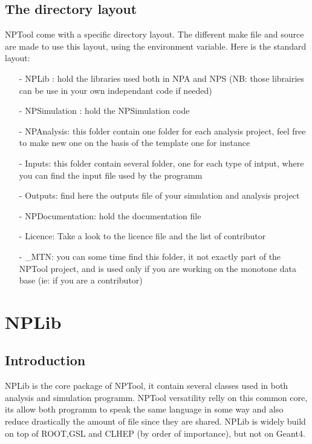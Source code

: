 \documentclass{book}
\begin{document}
				
				
\section{The directory layout}
	NPTool come with a specific directory layout. 
	The different make file and source are made to use this layout, using the environment variable. 
	Here is the standard layout:
		\begin{itemize}
			\item[-] NPLib : hold the libraries used both in NPA and NPS (NB: those librairies can be use in your own independant code if needed)
			\item[-] NPSimulation : hold the NPSimulation code
			\item[-] NPAnalysis: this folder contain one folder for each analysis project, feel free to make new one on the basis of the template one for instance
			\item[-] Inputs: this folder contain several folder, one for each type of intput, where you can find the input file used by the programm
			\item[-] Outputs: find here the outputs file of your simulation and analysis project
			\item[-] NPDocumentation: hold the documentation file
			\item[-] Licence: Take a look to the licence file and the list of contributor
			\item[-] \_MTN: you can some time find this folder, it not exactly part of the NPTool project, and is used only if you are working on the monotone data base (ie: if you are a contributor)
			\item[] 		
		\end{itemize}
\chapter[NPLib]{NPLib}
	\section{Introduction}
	
	NPLib is the core package of NPTool, it contain several classes used in both analysis and simulation programm.
	NPTool versatility relly on this common core, its allow both programm to speak the same language in some way and also reduce drastically the amount of file since they are shared.
	NPLib is widely build on top of ROOT,GSL and CLHEP (by order of importance), but not on Geant4.
	
\end{document}
